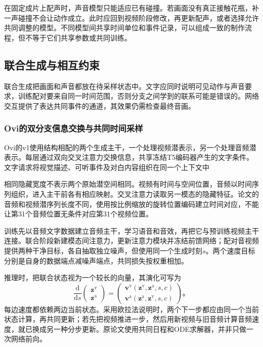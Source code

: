 在固定成片上配声时，声音模型只能适应已有碰撞。若画面没有真正接触花瓶，补一声碰撞不会让动作成立。此时应回到视频阶段修改，再更新配声，或者选择允许共同调整的模型。不同模型间共享时间单位和事件记录，可以组成一致的制作流程，但不等于它们共享参数或共同训练。

\subsection{联合生成与相互约束}
\label{sec:vision-multigen-joint-mechanism}

联合生成把画面和声音都放在待采样状态中。文字应同时说明可见动作与声音要求，训练配对要来自同一时间范围，否则分支之间学到的联系可能是错误的。网络交互提供了表达共同事件的通道，其效果仍需检查最终音画。

\subsubsection{Ovi的双分支信息交换与共同时间采样}
\label{sec:vision-multigen-ovi}

Ovi的v1使用结构相配的两个生成主干，一个处理视频潜表示，另一个处理音频潜表示。每层通过双向交叉注意力交换信息，共享冻结T5编码器产生的文字条件。文字请求将视觉描述、可听事件及对白内容组织在同一个上下文中

相同隐藏宽度不表示两个原始潜空间相同。视频有时间与空间位置，音频以时间序列组织，进入主干前各有相应映射。交叉注意力读取另一模态的隐藏特征。论文的音频和视频潜序列长度不同，使用按比例缩放的旋转位置编码建立时间对应，不能让第31个音频位置无条件对应第31个视频位置。

训练先以音频文字数据建立音频主干，学习语音和音效，再把它与预训练视频主干连接。联合阶段新建模态间注意力，更新注意力模块并冻结前馈网络；配对音视频提供两种干净目标，各自抽取独立噪声，但使用同一个生成时刻$s$。两个速度目标分别是自身的数据端点减噪声端点，共同损失按权重相加。

推理时，把联合状态视为一个较长的向量，其演化可写为
\begin{equation}
 \frac{\mathrm d}{\mathrm ds}
 \begin{pmatrix}\bm z^{\mathrm v}\\ \bm z^{\mathrm a}\end{pmatrix}
 =
 \begin{pmatrix}
 \bm v^{\mathrm v}(\bm z^{\mathrm v},\bm z^{\mathrm a},s,c)\\
 \bm v^{\mathrm a}(\bm z^{\mathrm a},\bm z^{\mathrm v},s,c)
 \end{pmatrix}\text{。}
 \label{eq:vision-joint-flow}
\end{equation}
每边速度都依赖两边当前状态。采用欧拉法说明时，两个下一步都应由同一个当前状态计算，再共同更新；若先把视频推进一步，然后用新视频与旧音频计算音频速度，就已换成另一种分步更新。原论文使用共同日程和ODE求解器，并非只做一次网络前向。

